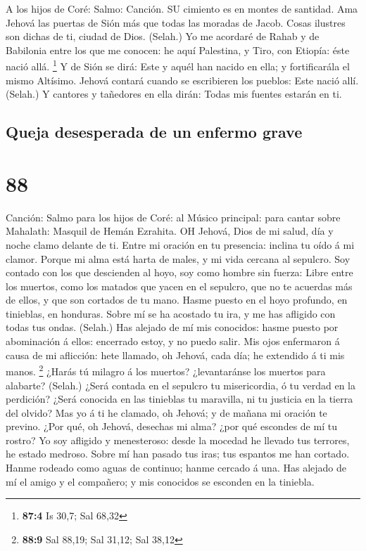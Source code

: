  A los hijos de Coré: Salmo: Canción. SU cimiento es en
montes de santidad.  Ama Jehová las puertas de Sión más que
todas las moradas de Jacob.  Cosas ilustres son dichas de
ti, ciudad de Dios. (Selah.)  Yo me acordaré de Rahab y de
Babilonia entre los que me conocen: he aquí Palestina, y Tiro, con
Etiopía: éste nació allá. \footnote{\textbf{87:4} Is 30,7; Sal 68,32}
 Y de Sión se dirá: Este y aquél han nacido en ella; y
fortificarála el mismo Altísimo.  Jehová contará cuando se
escribieren los pueblos: Este nació allí. (Selah.)  Y
cantores y tañedores en ella dirán: Todas mis fuentes estarán en ti.

\hypertarget{queja-desesperada-de-un-enfermo-grave}{%
\subsection{Queja desesperada de un enfermo
grave}\label{queja-desesperada-de-un-enfermo-grave}}

\hypertarget{section-87}{%
\section{88}\label{section-87}}

 Canción: Salmo para los hijos de Coré: al Músico principal:
para cantar sobre Mahalath: Masquil de Hemán Ezrahita. OH Jehová, Dios
de mi salud, día y noche clamo delante de ti.  Entre mi
oración en tu presencia: inclina tu oído á mi clamor. 
Porque mi alma está harta de males, y mi vida cercana al sepulcro.
 Soy contado con los que descienden al hoyo, soy como hombre
sin fuerza:  Libre entre los muertos, como los matados que
yacen en el sepulcro, que no te acuerdas más de ellos, y que son
cortados de tu mano.  Hasme puesto en el hoyo profundo, en
tinieblas, en honduras.  Sobre mí se ha acostado tu ira, y
me has afligido con todas tus ondas. (Selah.)  Has alejado
de mí mis conocidos: hasme puesto por abominación á ellos: encerrado
estoy, y no puedo salir.  Mis ojos enfermaron á causa de mi
aflicción: hete llamado, oh Jehová, cada día; he extendido á ti mis
manos. \footnote{\textbf{88:9} Sal 88,19; Sal 31,12; Sal 38,12}
 ¿Harás tú milagro á los muertos? ¿levantaránse los muertos
para alabarte? (Selah.)  ¿Será contada en el sepulcro tu
misericordia, ó tu verdad en la perdición?  ¿Será conocida
en las tinieblas tu maravilla, ni tu justicia en la tierra del olvido?
 Mas yo á ti he clamado, oh Jehová; y de mañana mi oración
te previno.  ¿Por qué, oh Jehová, desechas mi alma? ¿por
qué escondes de mí tu rostro?  Yo soy afligido y
menesteroso: desde la mocedad he llevado tus terrores, he estado
medroso.  Sobre mí han pasado tus iras; tus espantos me han
cortado.  Hanme rodeado como aguas de continuo; hanme
cercado á una.  Has alejado de mí el amigo y el compañero;
y mis conocidos se esconden en la tiniebla.

